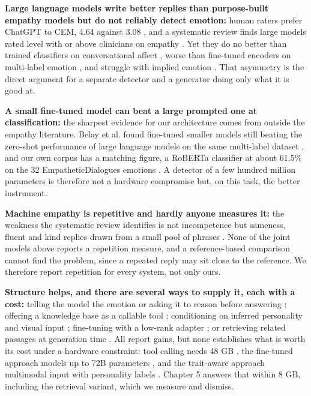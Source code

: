 \textbf{Large language models write better replies than purpose-built empathy models but do not reliably detect emotion: }human raters prefer ChatGPT to CEM, 4.64 against 3.08 \cite{qian2023llm}, and a systematic review finds large models rated level with or above clinicians on empathy \cite{sorin2024jmir}. Yet they do no better than trained classifiers on conversational affect \cite{feng2023affect}, worse than fine-tuned encoders on multi-label emotion \cite{belay2025}, and struggle with implied emotion \cite{koga2023implicit}. That asymmetry is the direct argument for a separate detector and a generator doing only what it is good at.

\textbf{A small fine-tuned model can beat a large prompted one at classification: }the sharpest evidence for our architecture comes from outside the empathy literature. Belay et al. found fine-tuned smaller models still beating the zero-shot performance of large language models on the same multi-label dataset \cite{belay2025}, and our own corpus has a matching figure, a RoBERTa classifier at about 61.5\% on the 32 EmpatheticDialogues emotions \cite{paranjape2020chirpy}. A detector of a few hundred million parameters is therefore not a hardware compromise but, on this task, the better instrument.

\textbf{Machine empathy is repetitive and hardly anyone measures it: }the weakness the systematic review identifies is not incompetence but sameness, fluent and kind replies drawn from a small pool of phrases \cite{sorin2024jmir}. None of the joint models above reports a repetition measure, and a reference-based comparison cannot find the problem, since a repeated reply may sit close to the reference. We therefore report repetition for every system, not only ours.

\textbf{Structure helps, and there are several ways to supply it, each with a cost: }telling the model the emotion or asking it to reason before answering \cite{qian2023llm,li2024emotioncot}; offering a knowledge base as a callable tool \cite{cao2025tooled}; conditioning on inferred personality and visual input \cite{wu2025traits}; fine-tuning with a low-rank adapter \cite{wang2025esc}; or retrieving related passages at generation time \cite{lewis2020rag,rasool2025}. All report gains, but none establishes what is worth its cost under a hardware constraint: tool calling needs 48 GB \cite{cao2025tooled}, the fine-tuned approach models up to 72B parameters \cite{wang2025esc}, and the trait-aware approach multimodal input with personality labels \cite{wu2025traits}. Chapter 5 answers that within 8 GB, including the retrieval variant, which we measure and dismiss.

